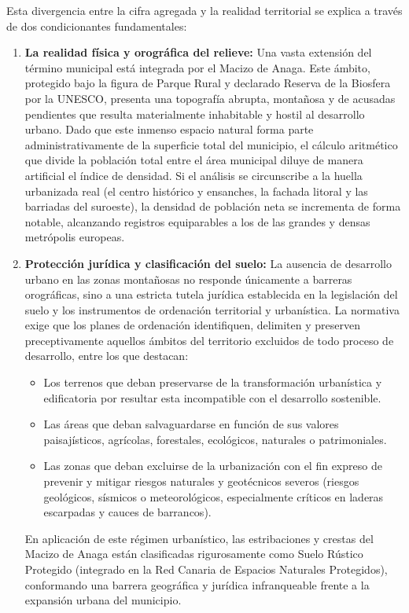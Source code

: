 Esta divergencia entre la cifra agregada y la realidad territorial se explica a través de dos condicionantes fundamentales:

\begin{enumerate}
  \item \textbf{La realidad física y orográfica del relieve:} Una vasta extensión del término municipal está integrada por el Macizo de Anaga. Este ámbito, protegido bajo la figura de Parque Rural y declarado Reserva de la Biosfera por la UNESCO, presenta una topografía abrupta, montañosa y de acusadas pendientes que resulta materialmente inhabitable y hostil al desarrollo urbano. Dado que este inmenso espacio natural forma parte administrativamente de la superficie total del municipio, el cálculo aritmético que divide la población total entre el área municipal diluye de manera artificial el índice de densidad. Si el análisis se circunscribe a la huella urbanizada real (el centro histórico y ensanches, la fachada litoral y las barriadas del suroeste), la densidad de población neta se incrementa de forma notable, alcanzando registros equiparables a los de las grandes y densas metrópolis europeas.
  \item \textbf{Protección jurídica y clasificación del suelo:} La ausencia de desarrollo urbano en las zonas montañosas no responde únicamente a barreras orográficas, sino a una estricta tutela jurídica establecida en la legislación del suelo y los instrumentos de ordenación territorial y urbanística. La normativa exige que los planes de ordenación identifiquen, delimiten y preserven preceptivamente aquellos ámbitos del territorio excluidos de todo proceso de desarrollo, entre los que destacan:
  \begin{itemize}
    \item Los terrenos que deban preservarse de la transformación urbanística y edificatoria por resultar esta incompatible con el desarrollo sostenible.
    \item Las áreas que deban salvaguardarse en función de sus valores paisajísticos, agrícolas, forestales, ecológicos, naturales o patrimoniales.
    \item Las zonas que deban excluirse de la urbanización con el fin expreso de prevenir y mitigar riesgos naturales y geotécnicos severos (riesgos geológicos, sísmicos o meteorológicos, especialmente críticos en laderas escarpadas y cauces de barrancos).
  \end{itemize}
  En aplicación de este régimen urbanístico, las estribaciones y crestas del Macizo de Anaga están clasificadas rigurosamente como Suelo Rústico Protegido (integrado en la Red Canaria de Espacios Naturales Protegidos), conformando una barrera geográfica y jurídica infranqueable frente a la expansión urbana del municipio.
\end{enumerate}


